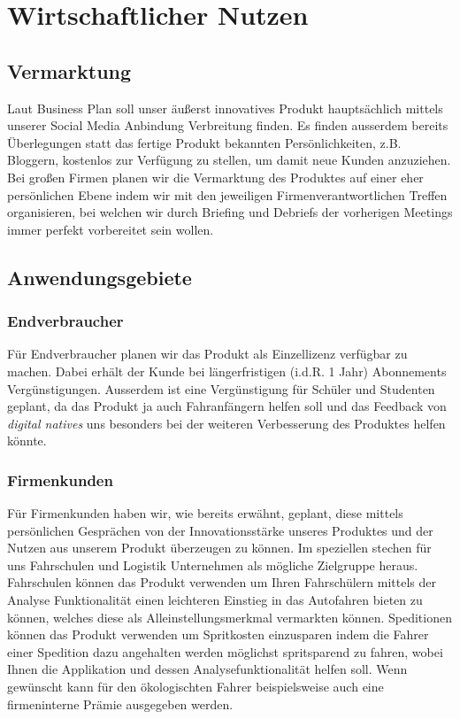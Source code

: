 \chapter{Wirtschaftlicher Nutzen}

\section{Vermarktung}
Laut Business Plan soll unser äußerst innovatives Produkt hauptsächlich mittels unserer Social Media Anbindung Verbreitung finden. Es finden ausserdem bereits Überlegungen statt das fertige Produkt bekannten Persönlichkeiten, z.B. Bloggern, kostenlos zur Verfügung zu stellen, um damit neue Kunden anzuziehen.
\newline
Bei großen Firmen planen wir die Vermarktung des Produktes auf einer eher persönlichen Ebene indem wir mit den jeweiligen Firmenverantwortlichen Treffen organisieren, bei welchen wir durch Briefing und Debriefs der vorherigen Meetings immer perfekt vorbereitet sein wollen.
\section{Anwendungsgebiete}
\subsection{Endverbraucher}
Für Endverbraucher planen wir das Produkt als Einzellizenz verfügbar zu machen. Dabei erhält der Kunde bei längerfristigen (i.d.R. 1 Jahr) Abonnements Vergünstigungen. Ausserdem ist eine Vergünstigung für Schüler und Studenten geplant, da das Produkt ja auch Fahranfängern helfen soll und das Feedback von \textit{digital natives} uns besonders bei der weiteren Verbesserung des Produktes helfen könnte.
\subsection{Firmenkunden}
Für Firmenkunden haben wir, wie bereits erwähnt, geplant, diese mittels persönlichen Gesprächen von der Innovationsstärke unseres Produktes und der Nutzen aus unserem Produkt überzeugen zu können. 
Im speziellen stechen für uns Fahrschulen und Logistik Unternehmen als mögliche Zielgruppe heraus. 
\newline
Fahrschulen können das Produkt verwenden um Ihren Fahrschülern  mittels der Analyse Funktionalität einen leichteren Einstieg in das Autofahren bieten zu können, welches diese als Alleinstellungsmerkmal vermarkten können.
\newline
Speditionen können das Produkt verwenden um Spritkosten einzusparen indem die Fahrer einer Spedition dazu angehalten werden möglichst spritsparend zu fahren, wobei Ihnen die Applikation und dessen Analysefunktionalität helfen soll. Wenn gewünscht kann für den ökologischten Fahrer beispielsweise auch eine firmeninterne Prämie ausgegeben werden.